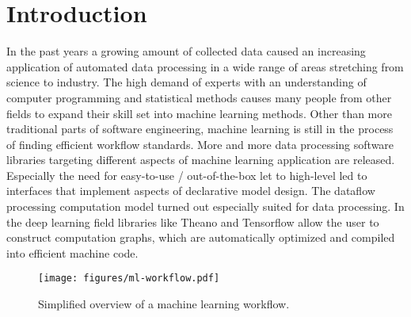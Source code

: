 \documentclass[english]{article}
\begin{document}
\section{Introduction}
In the past years a growing amount of collected data caused an increasing application of automated data processing in a wide range of areas stretching from  science to industry.
The high demand of experts with an understanding of computer programming and statistical methods causes many people from other fields to expand their skill set into machine learning methods. Other than more traditional parts of software engineering, machine learning is still in the process of finding efficient workflow standards. More and more data processing software libraries targeting different aspects of machine learning application are released. Especially the need for easy-to-use / out-of-the-box let to high-level led to interfaces that implement aspects of declarative model design. The dataflow processing computation model turned out especially suited for data processing. In the deep learning field libraries like Theano and Tensorflow allow the user to construct computation graphs, which are automatically optimized and compiled into efficient machine code.

\begin{figure}[h]
  \centering
  \texttt{[image: figures/ml-workflow.pdf]}
  \caption{Simplified overview of a machine learning workflow.}
  \label{ml-workflow}
\end{figure}
\end{document}
